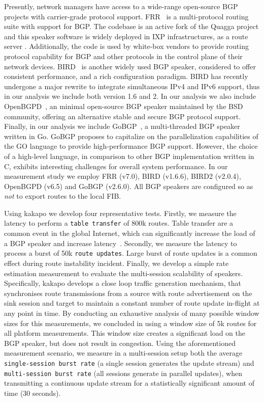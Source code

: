 Presently, network managers have access to a wide-range open-source BGP projects
with carrier-grade protocol support. FRR~\cite{frr} is a multi-protocol routing suite
with support for BGP. The codebase is an active fork of the Quagga project and
this speaker software is widely deployed in IXP infrastructures, as a route
server . Additionally, the code is used by white-box
vendors to provide routing protocol capability for BGP and other protocols in the control plane of their network devices.
BIRD~\cite{bird} is another widely used BGP speaker, considered to offer consistent performance,
and a rich configuration paradigm. BIRD has recently undergone a major
rewrite to integrate simultaneous IPv4 and IPv6 support, thus in our analysis we include both
version 1.6 and 2. In our analysis we also include OpenBGPD~\cite{openbgpd},
an minimal open-source BGP speaker maintained by
the BSD community, offering an alternative stable and secure BGP protocol support. Finally,
in our analysis we include GoBGP~\cite{gobgp}, a multi-threaded BGP speaker written in Go.
GoBGP proposes to capitalize on the parallelization capabilities of the GO language to provide high-performance BGP
support. However, the choice of a high-level language, in comparison to
other BGP implementation written in C, exhibits interesting challenges for overall
system performance. In our measurement study we employ FRR (v7.0), BIRD
(v1.6.6), BIRD2 (v2.0.4), OpenBGPD (v6.5) and GoBGP (v2.6.0).  All BGP speakers are
configured so as {\it not} to export routes to the local FIB.

Using kakapo we develop four representative tests. Firstly, we measure the
latency to perform a {\tt table transfer} of 800k routes. Table transfer are
a common event in the global Internet, which can significantly increase the
load of a BGP speaker and increase latency~\cite{Cheng2011}. Secondly, we measure
the latency to process a burst of 50k {\tt route updates}. Large burst of route
updates is a common effect during route instability incident. Finally, we
develop a simple rate estimation measurement to evaluate the multi-session
scalability of speakers. Specifically, kakapo develops a close loop traffic
generation mechanism, that synchronises route transmissions from a source with
route advertisement on the sink session and target to maintain a constant number
of route update in-flight at any point in time. By conducting an exhaustive
analysis of many possible window sizes for this measurements, we concluded in
using a window size of 5k routes for all platform measurements. This window
size creates a significant load on the BGP speaker, but does not result in
congestion. Using the aforementioned measurement scenario, we measure in
a multi-session setup both the average {\tt single-session burst rate} (a
single session generates the update stream) and {\tt multi-session burst rate}
(all sessions generate in parallel updates), when transmitting a continuous
update stream for a statistically significant amount of time (30 seconds).


